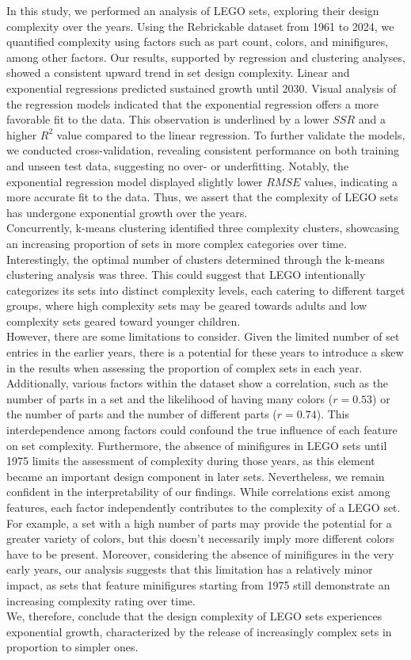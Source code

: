 \documentclass{article}
\theoremstyle{plain}
\theoremstyle{definition}
\theoremstyle{remark}
\begin{document}
In this study, we performed an analysis of LEGO sets, exploring their design complexity over the years. Using the Rebrickable dataset from 1961 to 2024, we quantified complexity using factors such as part count, colors, and minifigures, among other factors. Our results, supported by regression and clustering analyses, showed a consistent upward trend in set design complexity. Linear and exponential regressions predicted sustained growth until 2030. Visual analysis of the regression models indicated that the exponential regression offers a more favorable fit to the data. This observation is underlined by a lower $SSR$ and a higher $R^2$ value compared to the linear regression. To further validate the models, we conducted cross-validation, revealing consistent performance on both training and unseen test data, suggesting no over- or underfitting. Notably, the exponential regression model displayed slightly lower $RMSE$ values, indicating a more accurate fit to the data. Thus, we assert that the complexity of LEGO sets has undergone exponential growth over the years. \\
Concurrently, k-means clustering identified three complexity clusters, showcasing an increasing proportion of sets in more complex categories over time. Interestingly, the optimal number of clusters determined through the k-means clustering analysis was three. This could suggest that LEGO intentionally categorizes its sets into distinct complexity levels, each catering to different target groups, where high complexity sets may be geared towards adults and low complexity sets geared toward younger children.\\
However, there are some limitations to consider. Given the limited number of set entries in the earlier years, there is a potential for these years to introduce a skew in the results when assessing the proportion of complex sets in each year. Additionally, various factors within the dataset show a correlation, such as the number of parts in a set and the likelihood of having many colors ($r=0.53$) or the number of parts and the number of different parts ($r=0.74$). This interdependence among factors could confound the true influence of each feature on set complexity. Furthermore, the absence of minifigures in LEGO sets until 1975 limits the assessment of complexity during those years, as this element became an important design component in later sets.
Nevertheless, we remain confident in the interpretability of our findings. While correlations exist among features, each factor independently contributes to the complexity of a LEGO set. For example, a set with a high number of parts may provide the potential for a greater variety of colors, but this doesn't necessarily imply more different colors have to be present. Moreover, considering the absence of minifigures in the very early years, our analysis suggests that this limitation has a relatively minor impact, as sets that feature minifigures starting from 1975 still demonstrate an increasing complexity rating over time. \\
We, therefore, conclude that the design complexity of LEGO sets experiences exponential growth, characterized by the release of increasingly complex sets in proportion to simpler ones.
\end{document}
